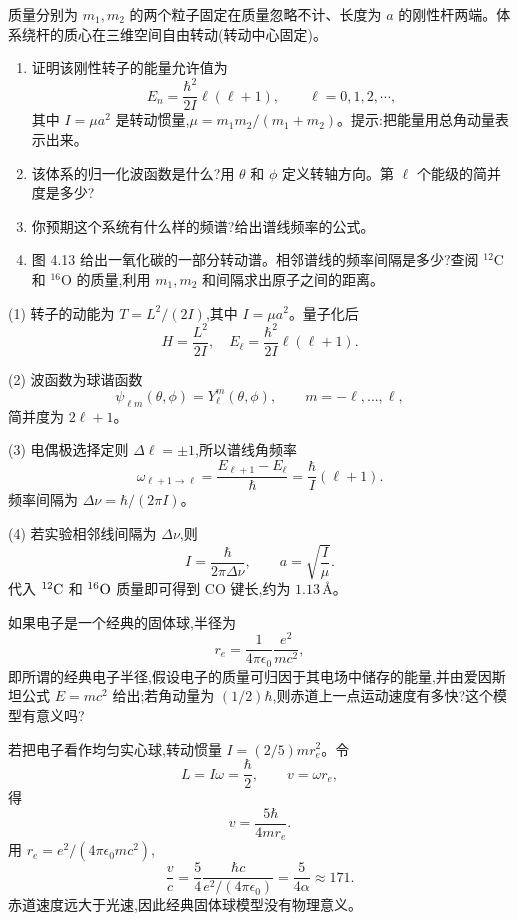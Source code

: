 \begin{question}
质量分别为 $m_1,m_2$ 的两个粒子固定在质量忽略不计、长度为 $a$ 的刚性杆两端。体系绕杆的质心在三维空间自由转动(转动中心固定)。
\begin{enumerate}
\item 证明该刚性转子的能量允许值为
\[
E_n=\frac{\hbar^2}{2I}\ell(\ell+1),\qquad \ell=0,1,2,\cdots,
\]
其中 $I=\mu a^2$ 是转动惯量,$\mu=m_1m_2/(m_1+m_2)$。提示:把能量用总角动量表示出来。
\item 该体系的归一化波函数是什么?用 $\theta$ 和 $\phi$ 定义转轴方向。第 $\ell$ 个能级的简并度是多少?
\item 你预期这个系统有什么样的频谱?给出谱线频率的公式。
\item 图 4.13 给出一氧化碳的一部分转动谱。相邻谱线的频率间隔是多少?查阅 ${}^{12}\mathrm C$ 和 ${}^{16}\mathrm O$ 的质量,利用 $m_1,m_2$ 和间隔求出原子之间的距离。
\end{enumerate}
\begin{solution}

(1) 转子的动能为 $T=L^2/(2I)$,其中 $I=\mu a^2$。量子化后
\[
H=\frac{L^2}{2I},
\quad
E_\ell=\frac{\hbar^2}{2I}\ell(\ell+1).
\]

(2) 波函数为球谐函数
\[
\psi_{\ell m}(\theta,\phi)=Y_\ell^m(\theta,
\phi),\qquad m=-\ell,\ldots,\ell,
\]
简并度为 $2\ell+1$。

(3) 电偶极选择定则 $\Delta\ell=\pm1$,所以谱线角频率
\[
\omega_{\ell+1\to\ell}=\frac{E_{\ell+1}-E_\ell}{\hbar}=\frac{\hbar}{I}(\ell+1).
\]
频率间隔为 $\Delta \nu=\hbar/(2\pi I)$。

(4) 若实验相邻线间隔为 $\Delta\nu$,则
\[
I=\frac{\hbar}{2\pi\Delta\nu},
\qquad
 a=\sqrt{\frac{I}{\mu}}.
\]
代入 ${}^{12}{\rm C}$ 和 ${}^{16}{\rm O}$ 质量即可得到 CO 键长,约为 $1.13\,\text{\AA}$。

\end{solution}
\end{question}

\begin{question}
如果电子是一个经典的固体球,半径为
\[
r_e=\frac{1}{4\pi\epsilon_0}\frac{e^2}{mc^2},
\]
即所谓的经典电子半径,假设电子的质量可归因于其电场中储存的能量,并由爱因斯坦公式 $E=mc^2$ 给出;若角动量为 $(1/2)\hbar$,则赤道上一点运动速度有多快?这个模型有意义吗?
\begin{solution}

若把电子看作均匀实心球,转动惯量 $I=(2/5)mr_e^2$。令
\[
L=I\omega=\frac{\hbar}{2},
\qquad v=\omega r_e,
\]
得
\[
v=\frac{5\hbar}{4mr_e}.
\]
用 $r_e=e^2/(4\pi\epsilon_0mc^2)$,
\[
\frac{v}{c}=\frac{5}{4}\frac{\hbar c}{e^2/(4\pi\epsilon_0)}=\frac{5}{4\alpha}\approx171.
\]
赤道速度远大于光速,因此经典固体球模型没有物理意义。

\end{solution}
\end{question}

